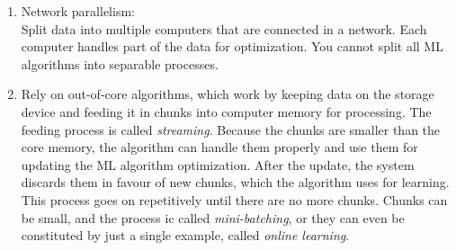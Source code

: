 \begin{enumerate}
	\item Network parallelism:\\
	Split data into multiple computers that are connected in a network. Each computer handles part of the data for optimization. You cannot split all ML algorithms into separable processes.
	\item Rely on out-of-core algorithms, which work by keeping data on the storage device and feeding it in chunks into computer memory for processing. The feeding process is called \emph{streaming}. Because the chunks are smaller than the core memory, the algorithm can handle them properly and use them for updating the ML algorithm optimization. After the update, the system discards them in favour of new chunks, which the algorithm uses for learning. This process goes on repetitively until there are no more chunks. Chunks can be small, and the process ic called \emph{mini-batching}, or they can even be constituted by just a single example, called \emph{online learning}.
\end{enumerate}